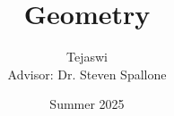 \documentclass[a4paper,12pt]{report}
\begin{document}
\title{\Huge \textbf{Geometry}}
\author{Tejaswi\\[1cm]{\small Advisor: Dr. Steven Spallone}}
\date{Summer 2025}
\maketitle


\tableofcontents
\newpage






\end{document}
